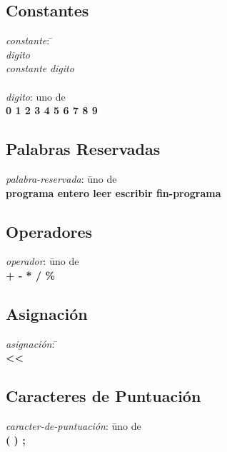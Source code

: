 \subsection{Constantes}

\begin{tabbing}

\textit{constante}: \= \+ \\
    \textit{digito} \\
    \textit{constante} \textit{digito}\\

\- \\
\textit{digito}: uno de \+ \\
    \textbf{0 1 2 3 4 5 6 7 8 9}

\end{tabbing}

\subsection{Palabras Reservadas}

\begin{tabbing}

\textit{palabra-reservada}: \= uno de \+ \\
    \textbf{programa entero leer escribir fin-programa}

\end{tabbing}

\subsection{Operadores}

\begin{tabbing}

\textit{operador}: \= uno de \+ \\
    \textbf{
        +
        \hspace{4pt}
        -
        \hspace{4pt}
        *
        \hspace{4pt}
        /
        \hspace{4pt}
        \%
    }

\end{tabbing}

\subsection{Asignación}

\begin{tabbing}

\textit{asignación}: \= \+ \\
    \textbf{<}\textbf{<}

\end{tabbing}

\subsection{Caracteres de Puntuación}

\begin{tabbing}

\textit{caracter-de-puntuación}: \= uno de \+ \\
    \textbf{
        (
        \hspace{4pt}
        )
        \hspace{4pt}
        ;
    }

\end{tabbing}
